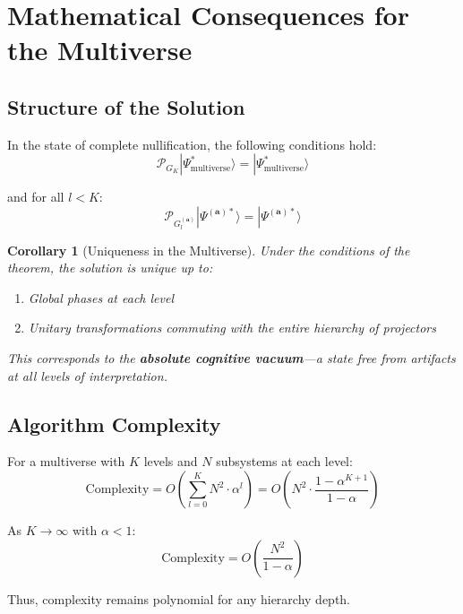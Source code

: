 \documentclass[12pt,a4paper]{article}
\newtheorem{corollary}[theorem]{Corollary}
\newcommand{\ket}[1]{|#1\rangle}
\newcommand{\calP}{\mathcal{P}}
\newcommand{\bfa}{\mathbf{a}}
\begin{document}
\section{Mathematical Consequences for the Multiverse}

\subsection{Structure of the Solution}

In the state of complete nullification, the following conditions hold:
\begin{equation}
\calP_{G_K} \ket{\Psi_{\text{multiverse}}^*} = \ket{\Psi_{\text{multiverse}}^*}
\end{equation}

and for all $l < K$:
\begin{equation}
\calP_{G_l^{(\bfa)}} \ket{\Psi^{(\bfa)*}} = \ket{\Psi^{(\bfa)*}}
\end{equation}

\begin{corollary}[Uniqueness in the Multiverse]
Under the conditions of the theorem, the solution is unique up to:
\begin{enumerate}
    \item Global phases at each level
    \item Unitary transformations commuting with the entire hierarchy of projectors
\end{enumerate}
This corresponds to the \textbf{absolute cognitive vacuum}---a state free from artifacts at all levels of interpretation.
\end{corollary}

\subsection{Algorithm Complexity}

For a multiverse with $K$ levels and $N$ subsystems at each level:
\begin{equation}
\text{Complexity} = O\left( \sum_{l=0}^K N^2 \cdot \alpha^l \right) = 
O\left( N^2 \cdot \frac{1 - \alpha^{K+1}}{1 - \alpha} \right)
\end{equation}

As $K \to \infty$ with $\alpha < 1$:
\begin{equation}
\text{Complexity} = O\left( \frac{N^2}{1 - \alpha} \right)
\end{equation}

Thus, complexity remains polynomial for any hierarchy depth.
\end{document}
